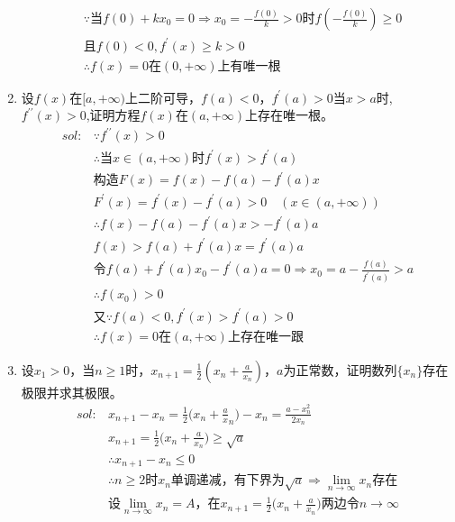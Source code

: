 \begin{enumerate}[{例}1.]
\begin{align*}
                &\because\mbox{当}f(0)+kx_0=0\Rightarrow x_0=-\frac{f(0)}{k}>0\mbox{时}f(-\frac{f(0)}{k})\geq 0\\
                &\mbox{且}f(0)<0,f^{\prime}(x)\geq k>0\\
                &\therefore f(x)=0\mbox{在}(0,+\infty)\mbox{上有唯一根}
        \end{align*}
    \item 设$f(x)$在$[a,+\infty)$上二阶可导，$f(a)<0$，$f^\prime(a)>0$当$x>a$时,$f^{\prime\prime}(x)>0$,证明方程$f(x)$在$(a,+\infty)$上存在唯一根。
        \begin{align*}
            sol:&\because f^{\prime\prime}(x)>0\\
                &\therefore \mbox{当}x\in (a,+\infty)\mbox{时}f^{\prime}(x)>f^{\prime}(a)\\
                &\mbox{构造}F(x)=f(x)-f(a)-f^{\prime}(a)x\\
                &F^{\prime}(x)=f^{\prime}(x)-f^{\prime}(a)>0\quad(x\in(a,+\infty))\\
                &\therefore f(x)-f(a)-f^{\prime}(a)x>-f^{\prime}(a)a\\
                &f(x)>f(a)+f^{\prime}(a)x=f^{\prime}(a)a\\
                &\mbox{令}f(a)+f^{\prime}(a)x_0-f^{\prime}(a)a=0\Rightarrow x_0=a-\frac{f(a)}{f^{\prime}(a)}>a\\
                &\therefore f(x_0)>0\\
                &\mbox{又}\because f(a)<0,f^{\prime}(x)>f^{\prime}(a)>0\\
                &\therefore f(x)=0\mbox{在}(a,+\infty)\mbox{上存在唯一跟}
        \end{align*}
    \item 设$x_1>0$，当$n\geq1$时，$x_{n+1}=\frac{1}{2}(x_n+\frac{a}{x_n})$，$a$为正常数，证明数列$\{x_n\}$存在极限并求其极限。
        \begin{align*}
            sol:&x_{n+1}-x_n=\frac{1}{2}\Big(x_n+\frac{a}x_n\Big)-x_n=\frac{a-x_n ^2}{2x_n}\\
                &x_{n+1}=\frac{1}{2}\Big(x_n+\frac{a}{x_n}\Big)\geq \sqrt{a}\\
                &\therefore x_{n+1}-x_n\leq 0\\
                &\therefore n\geq 2\mbox{时}x_n\mbox{单调递减，有下界为}\sqrt{a}\Rightarrow \lim_{n \to \infty}x_n\mbox{存在}\\
                &\mbox{设}\lim_{n \to \infty}x_n=A\mbox{，在}x_{n+1}=\frac{1}{2}\Big(x_n+\frac{a}{x_n}\Big)\mbox{两边令}n\to \infty\\

\end{align*}
\end{enumerate}
